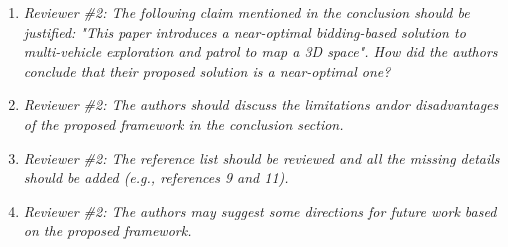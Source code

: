 \documentclass[11pt]{article}
\begin{document}
\begin{itemize}
\begin{enumerate}
\item {\itshape Reviewer \#2: The following claim mentioned in the conclusion should be justified: "This paper introduces a near-optimal bidding-based solution to multi-vehicle exploration and patrol to map a 3D space". How did the authors conclude that their proposed solution is a near-optimal one?}

\item {\itshape Reviewer \#2: The authors should discuss the limitations and\/or disadvantages of the proposed framework in the conclusion section.}

\item {\itshape Reviewer \#2: The reference list should be reviewed and all the missing details should be added (e.g., references 9 and 11).}

\item {\itshape Reviewer \#2: The authors may suggest some directions for future work based on the proposed framework.
}

\end{enumerate}
\end{itemize}
\end{document}
